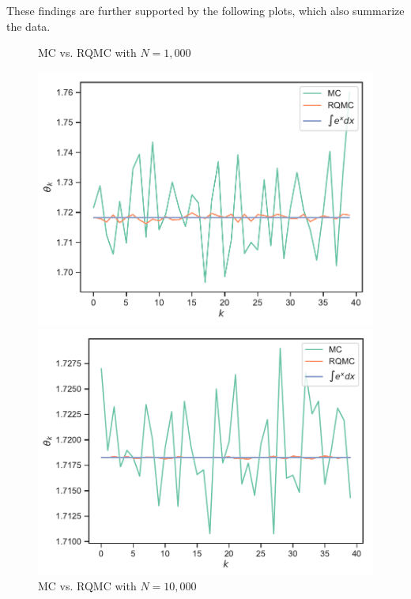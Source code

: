 \documentclass{article}
\begin{document}
\begin{enumerate}
        These findings are further supported by the following plots, which also summarize the data.
        \begin{figure}[H]
            \begin{minipage}{0.5\textwidth}
                \centering
                \caption{MC vs. RQMC with $N = 1,000$}
                \includegraphics[scale=0.6]{../figures/MC1.pdf}
            \end{minipage}
            \begin{minipage}{0.5\textwidth}
                \centering
                \caption{MC vs. RQMC with $N = 10,000$}
                \includegraphics[scale=0.6]{../figures/MC2.pdf}
            \end{minipage}
        \end{figure}

\end{enumerate}
\end{document}
